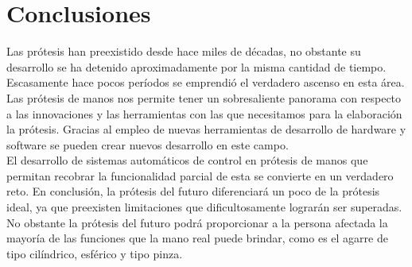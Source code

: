 \documentclass{article}
\begin{document}
\section{Conclusiones}
Las prótesis han preexistido desde hace miles de décadas, no   obstante   su   desarrollo   se   ha   detenido aproximadamente por  la  misma  cantidad  de  tiempo. Escasamente   hace   pocos   períodos   se   emprendió   el verdadero ascenso en esta área.   Las prótesis de manos nos   permite tener un sobresaliente panorama con respecto a las  innovaciones    y  las  herramientas  con  las que necesitamos para la elaboración  la prótesis. Gracias   al   empleo   de   nuevas   herramientas   de desarrollo   de   hardware  y  software  se   pueden  crear nuevos  desarrollo  en  este  campo. \\ El desarrollo de sistemas automáticos de control en prótesis de manos que permitan recobrar la funcionalidad  parcial  de  esta  se convierte en un verdadero reto. En conclusión, la prótesis del futuro diferenciará un poco de  la  prótesis  ideal,  ya que    preexisten    limitaciones    que    dificultosamente lograrán ser superadas. No obstante la prótesis del futuro podrá proporcionar a la persona afectada la mayoría  de las funciones que la mano real puede brindar, como es el agarre de tipo cilíndrico, esférico y tipo pinza.






\end{document}
